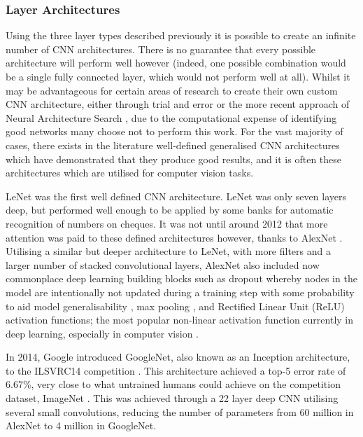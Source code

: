 \subsubsection{Layer Architectures}\label{ch:Background,sec:CNN,sub:CNN,subsub:layerArchitecture}

Using the three layer types described previously it is possible to create an infinite number of CNN architectures. There is no guarantee that every possible architecture will perform well however (indeed, one possible combination would be a single fully connected layer, which would not perform well at all). Whilst it may be advantageous for certain areas of research to create their own custom CNN architecture, either through trial and error or the more recent approach of Neural Architecture Search \cite{elsken_neural_2018}, due to the computational expense of identifying good networks many choose not to perform this work. For the vast majority of cases, there exists in the literature well-defined generalised CNN architectures which have demonstrated that they produce good results, and it is often these architectures which are utilised for computer vision tasks. 

LeNet \cite{lecun_gradient-based_1998} was the first well defined CNN architecture. LeNet was only seven layers deep, but performed well enough to be applied by some banks for automatic recognition of numbers on cheques. It was not until around 2012 that more attention was paid to these defined architectures however, thanks to AlexNet \cite{krizhevsky_imagenet_2012}. Utilising a similar but deeper architecture to LeNet, with more filters and a larger number of stacked convolutional layers, AlexNet also included now commonplace deep learning building blocks such as dropout whereby nodes in the model are intentionally not updated during a training step with some probability to aid model generalisability \cite{srivastava_dropout:_2014}, max pooling \cite{boureau_theoretical_2010}, and Rectified Linear Unit (ReLU) activation functions; the most popular non-linear activation function currently in deep learning, especially in computer vision \cite{he_delving_2015}.

 In 2014, Google introduced GoogleNet, also known as an Inception architecture, to the ILSVRC14 competition \cite{szegedy_going_2015}. This architecture achieved a top-5 error rate of 6.67\%, very close to what untrained humans could achieve on the competition dataset, ImageNet \cite{krizhevsky_imagenet_2012}. This was achieved through a 22 layer deep CNN utilising several small convolutions, reducing the number of parameters from 60 million in AlexNet to 4 million in GoogleNet. 

